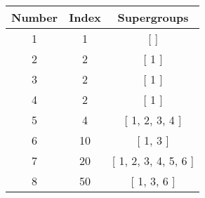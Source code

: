 \begin{center}
\begin{tabular}[H]{|| c c c ||}
\hline
Number &  Index &  Supergroups
\\\hline
1 & 1 & [  ]
\\\hline
2 & 2 & [ 1 ]
\\\hline
3 & 2 & [ 1 ]
\\\hline
4 & 2 & [ 1 ]
\\\hline
5 & 4 & [ 1, 2, 3, 4 ]
\\\hline
6 & 10 & [ 1, 3 ]
\\\hline
7 & 20 & [ 1, 2, 3, 4, 5, 6 ]
\\\hline
8 & 50 & [ 1, 3, 6 ]
\\\hline
\end{tabular}
\end{center}

